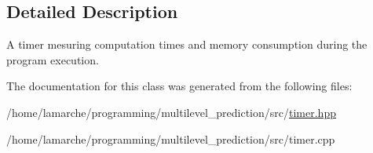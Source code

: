 \subsection{Detailed Description}
A timer mesuring computation times and memory consumption during the program execution. 

The documentation for this class was generated from the following files\-:\begin{DoxyCompactItemize}
\item 
/home/lamarche/programming/multilevel\-\_\-prediction/src/\hyperlink{timer_8hpp}{timer.\-hpp}\item 
/home/lamarche/programming/multilevel\-\_\-prediction/src/timer.\-cpp\end{DoxyCompactItemize}
